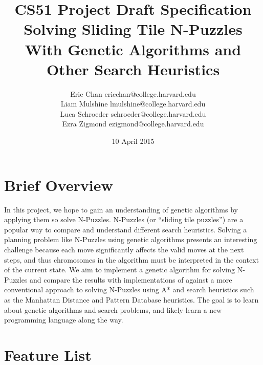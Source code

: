 \documentclass[12pt]{article}
\begin{document}
\title{
  CS51 Project Draft Specification\\
  \Large{Solving Sliding Tile N-Puzzles With Genetic Algorithms and Other Search Heuristics}
}
\author{Eric Chan ericchan@college.harvard.edu \\ Liam Mulshine lmulshine@college.harvard.edu \\ Luca Schroeder schroeder@college.harvard.edu \\ Ezra Zigmond ezigmond@college.harvard.edu \\ }
\date{10 April 2015}
\maketitle
\section{Brief Overview}
In this project, we hope to gain an understanding of genetic algorithms by applying them so solve N-Puzzles. N-Puzzles (or “sliding tile puzzles”) are a popular way to compare and understand different search heuristics. Solving a planning problem like N-Puzzles using genetic algorithms presents an interesting challenge because each move significantly affects the valid moves at the next steps, and thus chromosomes in the algorithm must be interpreted in the context of the current state. We aim to implement a genetic algorithm for solving N-Puzzles and compare the results with implementations of against a more conventional approach to solving N-Puzzles using A* and search heuristics such as the Manhattan Distance and Pattern Database heuristics. The goal is to learn about genetic algorithms and search problems, and likely learn a new programming language along the way. 
						
\section{Feature List} 
\end{document}
